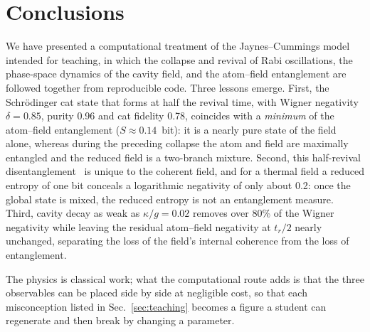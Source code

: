 \documentclass{iopjournal}
\begin{document}
\section{Conclusions}
\label{sec:conclusions}

We have presented a computational treatment of the Jaynes--Cummings model intended for teaching, in which the collapse and revival of Rabi oscillations, the phase-space dynamics of the cavity field, and the atom--field entanglement are followed together from reproducible code. Three lessons emerge. First, the Schr\"{o}dinger cat state that forms at half the revival time, with Wigner negativity $\delta = 0.85$, purity 0.96 and cat fidelity 0.78, coincides with a \emph{minimum} of the atom--field entanglement ($S \approx 0.14$~bit): it is a nearly pure state of the field alone, whereas during the preceding collapse the atom and field are maximally entangled and the reduced field is a two-branch mixture. Second, this half-revival disentanglement~\cite{gea-banacloche1990, phoenix1991} is unique to the coherent field, and for a thermal field a reduced entropy of one bit conceals a logarithmic negativity of only about 0.2: once the global state is mixed, the reduced entropy is not an entanglement measure. Third, cavity decay as weak as $\kappa/g = 0.02$ removes over 80\% of the Wigner negativity while leaving the residual atom--field negativity at $t_r/2$ nearly unchanged, separating the loss of the field's internal coherence from the loss of entanglement.

The physics is classical work; what the computational route adds is that the three observables can be placed side by side at negligible cost, so that each misconception listed in Sec.~\ref{sec:teaching} becomes a figure a student can regenerate and then break by changing a parameter.





\end{document}
